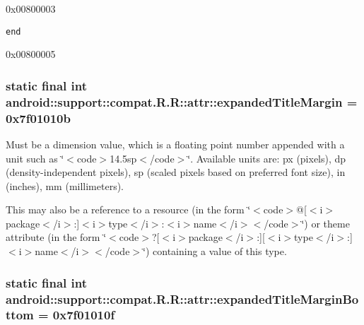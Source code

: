0x00800003

{\tt end}

0x00800005\hypertarget{classandroid_1_1support_1_1compat_1_1_r_1_1attr_03a3238846ae5dc48feb86d86291ac1e}{
\subsubsection[{expandedTitleMargin}]{\setlength{\rightskip}{0pt plus 5cm}static final int android::support::compat.R.R::attr::expandedTitleMargin = 0x7f01010b}}
\label{classandroid_1_1support_1_1compat_1_1_r_1_1attr_03a3238846ae5dc48feb86d86291ac1e}


Must be a dimension value, which is a floating point number appended with a unit such as \char`\"{}$<$code$>$14.5sp$<$/code$>$\char`\"{}. Available units are: px (pixels), dp (density-independent pixels), sp (scaled pixels based on preferred font size), in (inches), mm (millimeters). 

This may also be a reference to a resource (in the form \char`\"{}$<$code$>$@\mbox{[}$<$i$>$package$<$/i$>$:\mbox{]}$<$i$>$type$<$/i$>$:$<$i$>$name$<$/i$>$$<$/code$>$\char`\"{}) or theme attribute (in the form \char`\"{}$<$code$>$?\mbox{[}$<$i$>$package$<$/i$>$:\mbox{]}\mbox{[}$<$i$>$type$<$/i$>$:\mbox{]}$<$i$>$name$<$/i$>$$<$/code$>$\char`\"{}) containing a value of this type. \hypertarget{classandroid_1_1support_1_1compat_1_1_r_1_1attr_3a00d6307f42b28f3769d24b1f56ad47}{
\subsubsection[{expandedTitleMarginBottom}]{\setlength{\rightskip}{0pt plus 5cm}static final int android::support::compat.R.R::attr::expandedTitleMarginBottom = 0x7f01010f}}
\label{classandroid_1_1support_1_1compat_1_1_r_1_1attr_3a00d6307f42b28f3769d24b1f56ad47}


